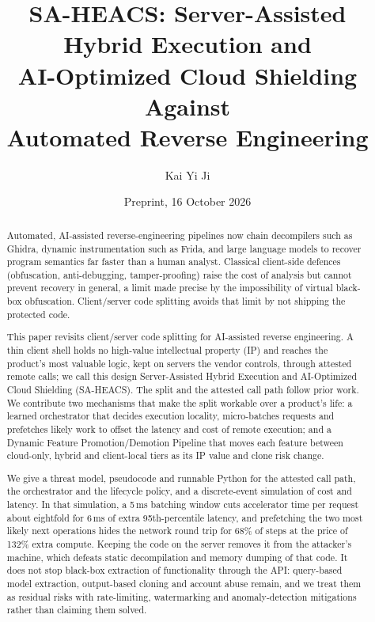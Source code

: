 \documentclass[11pt,a4paper]{article}
\title{\textbf{SA-HEACS: Server-Assisted Hybrid Execution and\\
       AI-Optimized Cloud Shielding Against\\ Automated Reverse Engineering}}
\author{Kai Yi Ji}
\date{Preprint, 16 October 2026}
\begin{document}
\maketitle
\thispagestyle{plain}

\begin{abstract}
\noindent
Automated, AI-assisted reverse-engineering pipelines now chain decompilers such as Ghidra,
dynamic instrumentation such as Frida, and large language models to recover program
semantics far faster than a human analyst. Classical client-side defences (obfuscation,
anti-debugging, tamper-proofing) raise the cost of analysis but cannot prevent recovery in
general, a limit made precise by the impossibility of virtual black-box obfuscation.
Client/server code splitting avoids that limit by not shipping the protected code.

This paper revisits client/server code splitting for AI-assisted reverse engineering. A
thin client shell holds no high-value intellectual property (IP) and reaches the product's
most valuable logic, kept on servers the vendor controls, through attested remote calls; we
call this design Server-Assisted Hybrid Execution and AI-Optimized Cloud Shielding
(SA-HEACS). The split and the attested call path follow prior work. We contribute two
mechanisms that make the split workable over a product's life: a learned orchestrator that
decides execution locality, micro-batches requests and prefetches likely work to offset the
latency and cost of remote execution; and a Dynamic Feature Promotion/Demotion Pipeline
that moves each feature between cloud-only, hybrid and client-local tiers as its IP value
and clone risk change.

We give a threat model, pseudocode and runnable Python for the attested call path, the
orchestrator and the lifecycle policy, and a discrete-event simulation of cost and latency.
In that simulation, a 5\,ms batching window cuts accelerator time per request about eightfold
for 6\,ms of extra 95th-percentile latency, and prefetching the two most likely next
operations hides the network round trip for 68\% of steps at the price of 132\% extra
compute. Keeping the code on the server removes it from the attacker's machine, which defeats
static decompilation and memory dumping of that code. It does not stop black-box extraction
of functionality through the API: query-based model extraction, output-based cloning and
account abuse remain, and we treat them as residual risks with rate-limiting, watermarking
and anomaly-detection mitigations rather than claiming them solved.
\end{abstract}
\end{document}
